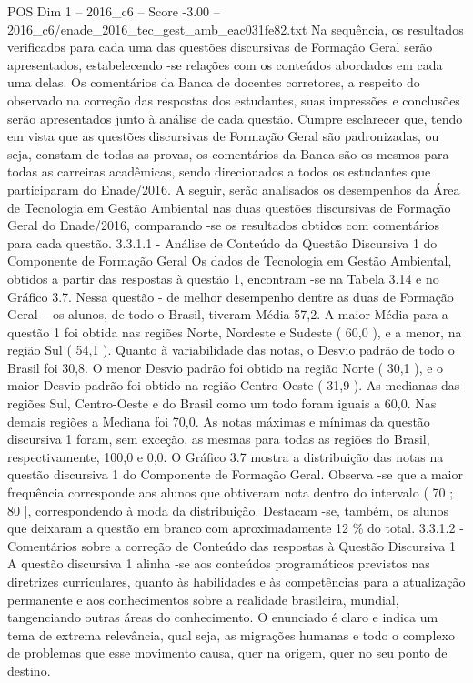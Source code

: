 \begin{textsample}{POS Dim 1 – 2016\_c6 – Score -3.00 – 2016\_c6/enade\_2016\_tec\_gest\_amb\_eac031fe82.txt}
Na sequência, os resultados verificados para cada uma das questões discursivas de Formação Geral serão apresentados, estabelecendo -se relações com os conteúdos abordados em cada uma delas.
Os comentários da Banca de docentes corretores, a respeito do observado na correção das respostas dos estudantes, suas impressões e conclusões serão apresentados junto à análise de cada questão.
Cumpre esclarecer que, tendo em vista que as questões discursivas de Formação Geral são padronizadas, ou seja, constam de todas as provas, os comentários da Banca são os mesmos para todas as carreiras acadêmicas, sendo direcionados a todos os estudantes que participaram do Enade/2016.
A seguir, serão analisados os desempenhos da Área de Tecnologia em Gestão Ambiental nas duas questões discursivas de Formação Geral do Enade/2016, comparando -se os resultados obtidos com comentários para cada questão. 3.3.1.1 - Análise de Conteúdo da Questão Discursiva 1 do Componente de Formação Geral Os dados de Tecnologia em Gestão Ambiental, obtidos a partir das respostas à questão 1, encontram -se na Tabela 3.14 e no Gráfico 3.7.
Nessa questão - de melhor desempenho dentre as duas de Formação Geral – os alunos, de todo o Brasil, tiveram Média 57,2.
A maior Média para a questão 1 foi obtida nas regiões Norte, Nordeste e Sudeste ( 60,0 ), e a menor, na região Sul ( 54,1 ).
Quanto à variabilidade das notas, o Desvio padrão de todo o Brasil foi 30,8.
O menor Desvio padrão foi obtido na região Norte ( 30,1 ), e o maior Desvio padrão foi obtido na região Centro-Oeste ( 31,9 ).
As medianas das regiões Sul, Centro-Oeste e do Brasil como um todo foram iguais a 60,0.
Nas demais regiões a Mediana foi 70,0.
As notas máximas e mínimas da questão discursiva 1 foram, sem exceção, as mesmas para todas as regiões do Brasil, respectivamente, 100,0 e 0,0.
O Gráfico 3.7 mostra a distribuição das notas na questão discursiva 1 do Componente de Formação Geral.
Observa -se que a maior frequência corresponde aos alunos que obtiveram nota dentro do intervalo ( 70 ; 80 ], correspondendo à moda da distribuição.
Destacam -se, também, os alunos que deixaram a questão em branco com aproximadamente 12 \% do total. 3.3.1.2 - Comentários sobre a correção de Conteúdo das respostas à Questão Discursiva 1 A questão discursiva 1 alinha -se aos conteúdos programáticos previstos nas diretrizes curriculares, quanto às habilidades e às competências para a atualização permanente e aos conhecimentos sobre a realidade brasileira, mundial, tangenciando outras áreas do conhecimento.
O enunciado é claro e indica um tema de extrema relevância, qual seja, as migrações humanas e todo o complexo de problemas que esse movimento causa, quer na origem, quer no seu ponto de destino.

\end{textsample}
